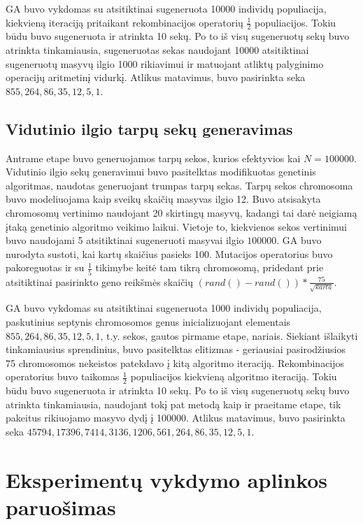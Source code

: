 \documentclass{VUMIFInfKursinis}
\begin{document}
GA buvo vykdomas su atsitiktinai sugeneruota 10000 individų populiacija, kiekvieną iteraciją pritaikant rekombinacijos operatorių
$\frac{1}{2}$ populiacijos.
Tokiu būdu buvo sugeneruota ir atrinkta 10 sekų.
Po to iš visų sugeneruotų sekų buvo atrinkta tinkamiausia, sugeneruotas sekas naudojant 10000 atsitiktinai sugeneruotų masyvų ilgio 1000 rikiavimui
ir matuojant atliktų palyginimo operacijų aritmetinį vidurkį.
Atlikus matavimus, buvo pasirinkta seka $855, 264, 86, 35, 12, 5, 1$.

\subsection{Vidutinio ilgio tarpų sekų generavimas}
Antrame etape buvo generuojamos tarpų sekos, kurios efektyvios kai $N=100000$.
Vidutinio ilgio sekų generavimui buvo pasitelktas modifikuotas genetinis algoritmas, naudotas generuojant trumpas tarpų sekas.
Tarpų sekos chromosoma buvo modeliuojama kaip sveikų skaičių masyvas ilgio 12.
Buvo atsisakyta chromosomų vertinimo naudojant 20 skirtingų masyvų, kadangi tai darė neigiamą įtaką genetinio algoritmo veikimo laikui.
Vietoje to, kiekvienos sekos vertinimui buvo naudojami 5 atsitiktinai sugeneruoti masyvai ilgio $100000$.
GA buvo nurodyta sustoti, kai kartų skaičius pasieks 100.
Mutacijos operatorius buvo pakoreguotas ir su $\frac{1}{5}$ tikimybe keitė tam tikrą chromosomą,
pridedant prie atsitiktinai pasirinkto geno reikšmės skaičių $(rand()-rand())*\frac{75}{\sqrt{karta}}$.

GA buvo vykdomas su atsitiktinai sugeneruota 1000 individų populiacija,
paskutinius septynis chromosomos genus inicializuojant elementais $855, 264, 86, 35, 12, 5, 1$, t.y. sekos, gautos pirmame etape, nariais.
Siekiant išlaikyti tinkamiausius sprendinius, buvo pasitelktas elitizmas - geriausiai pasirodžiusios 75 chromosomos nekeistos
patekdavo į kitą algoritmo iteraciją.
Rekombinacijos operatorius buvo taikomas $\frac{1}{2}$ populiacijos kiekvieną algoritmo iteraciją.
Tokiu būdu buvo sugeneruota ir atrinkta 10 sekų.
Po to iš visų sugeneruotų sekų buvo atrinkta tinkamiausia, naudojant tokį pat metodą kaip ir praeitame etape, tik pakeitus rikiuojamo masyvo dydį į 100000.
Atlikus matavimus, buvo pasirinkta seka $45794, 17396, 7414, 3136, 1206, 561, 264, 86, 35, 12, 5, 1$.


\section{Eksperimentų vykdymo aplinkos paruošimas}
\end{document}
